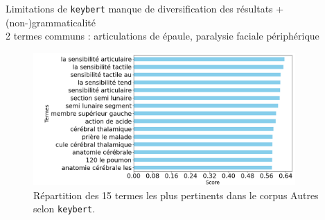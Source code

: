 \begin{frame}{Limitations de \texttt{keybert}}
\danger{} manque de diversification des résultats + (non-)grammaticalité\\
{\small 2 termes communs : \og{}articulations de épaule\fg{}, \og{}paralysie faciale périphérique\fg{}}
    \begin{figure}[!ht]
        \centering
        \includegraphics[width=100mm,scale=0.5]{pic/termes_keybert_autres.png}
        \caption{Répartition des 15 termes les plus pertinents dans le corpus \og{}Autres\fg{} selon \texttt{keybert}.}
        \label{fig:enter-label}
    \end{figure}
\end{frame}

